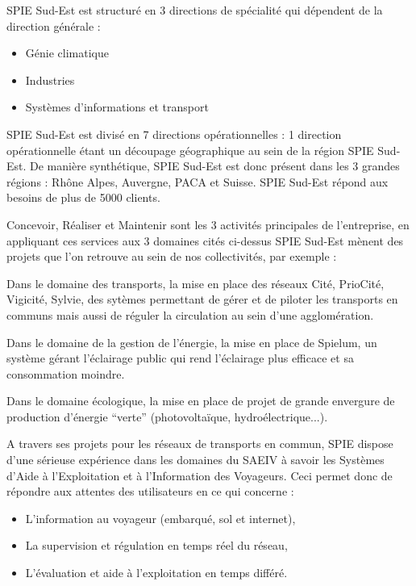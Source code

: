 SPIE Sud-Est est structuré en 3 directions de spécialité qui dépendent de la direction générale :

\begin{itemize}
\item Génie climatique
\item Industries
\item Systèmes d’informations et transport
\end{itemize}

SPIE Sud-Est est divisé en 7 directions opérationnelles : 1 direction opérationnelle étant un découpage géographique au sein de la région SPIE Sud-Est. De manière synthétique, SPIE Sud-Est est donc présent dans les 3 grandes régions : Rhône Alpes, Auvergne, PACA et  Suisse. SPIE Sud-Est répond aux besoins de plus de 5000 clients.


Concevoir, Réaliser et Maintenir sont les 3 activités principales de l’entreprise, en appliquant ces services aux 3 domaines cités ci-dessus SPIE Sud-Est mènent des projets que l’on retrouve au sein de nos collectivités, par exemple :

Dans le domaine des transports, la mise en place des réseaux Cité, PrioCité, Vigicité, Sylvie,  des sytèmes permettant de gérer et de piloter les transports en communs mais aussi de réguler la circulation au sein d’une agglomération.

Dans le domaine de la gestion de l’énergie, la mise en place de Spielum, un système gérant l’éclairage public qui rend l’éclairage plus efficace et sa consommation moindre.

Dans le domaine écologique, la mise en place de projet de grande envergure de production d’énergie “verte” (photovoltaïque, hydroélectrique...).

A travers ses projets pour les réseaux de transports en commun, SPIE dispose d’une sérieuse expérience dans les domaines du SAEIV à savoir les Systèmes d’Aide à l’Exploitation et à l’Information des Voyageurs. Ceci permet donc de répondre aux attentes des utilisateurs en ce qui concerne :

\begin{itemize}
\item L’information au voyageur (embarqué, sol et internet),
\item La supervision et régulation en temps réel du réseau,
\item L’évaluation et aide à l’exploitation en temps différé.
\end{itemize}

